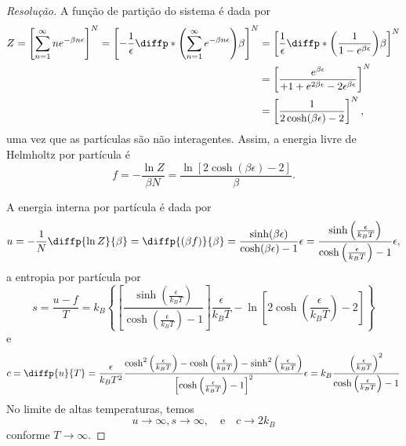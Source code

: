 \begin{proof}[Resolução]
    A função de partição do sistema é dada por
    \begin{align*}
        Z = \left[\sum_{n=1}^\infty ne^{-\beta n \epsilon}\right]^N = \left[-\frac{1}{\epsilon}\diffp*{\left(\sum_{n=1}^\infty e^{-\beta n \epsilon}\right)}{\beta}\right]^N &= \left[\frac1{\epsilon} \diffp*{\left(\frac{1}{1 - e^{\beta  \epsilon}}\right)}{\beta}\right]^N\\&= \left[ \frac{e^{\beta \epsilon}}{+ 1 + e^{2\beta \epsilon} - 2 \epsilon^{\beta \epsilon} }\right]^N\\&= \left[\frac{1}{2\cosh(\beta \epsilon) - 2}\right]^N,
    \end{align*}
    uma vez que as partículas são não interagentes. Assim, a energia livre de Helmholtz por partícula é
    \begin{equation*}
        f = - \frac{\ln Z}{\beta N} = \frac{\ln\left[2\cosh(\beta \epsilon) - 2\right]}{\beta}.
    \end{equation*}

    A energia interna por partícula é dada por
    \begin{equation*}
        u = - \frac{1}{N}\diffp{\ln Z}{\beta} = \diffp{(\beta f)}{\beta} = \frac{\sinh(\beta \epsilon)}{\cosh(\beta \epsilon) - 1}\epsilon = \frac{\sinh\left(\frac{\epsilon}{k_BT}\right)}{\cosh\left(\frac{\epsilon}{k_BT}\right) - 1}\epsilon,
    \end{equation*}
    a entropia por partícula por
    \begin{equation*}
        s = \frac{u - f}{T} = k_B\left\{\left[\frac{\sinh\left(\frac{\epsilon}{k_BT}\right)}{\cosh\left(\frac{\epsilon}{k_BT}\right) - 1}\right]\frac{\epsilon}{k_B T}-\ln\left[2\cosh\left(\frac{\epsilon}{k_BT}\right)- 2\right]\right\}
    \end{equation*}
    e
    \begin{equation*}
        c = \diffp{u}{T} = \frac{\epsilon}{k_B T^2}\frac{\cosh^2\left(\frac{\epsilon}{k_BT}\right) - \cosh\left(\frac{\epsilon}{k_BT}\right) - \sinh^2\left(\frac{\epsilon}{k_BT}\right)}{\left[\cosh\left(\frac{\epsilon}{k_BT}\right)-1\right]^2}\epsilon =  k_B\frac{\left(\frac{\epsilon}{k_B T}\right)^2}{\cosh\left(\frac{\epsilon}{k_BT}\right) - 1}
    \end{equation*}
    No limite de altas temperaturas, temos
    \begin{equation*}
        u\to\infty, s \to \infty, \quad\text{e}\quad c \to 2 k_B
    \end{equation*}
    conforme \(T \to \infty\).
\end{proof}
